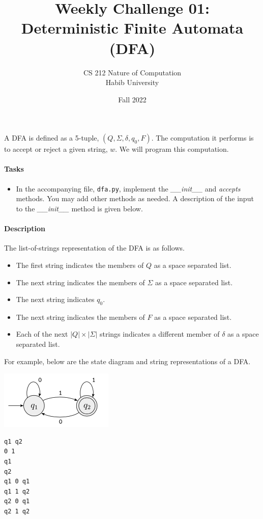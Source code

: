 \documentclass[a4paper]{exam}
\title{Weekly Challenge 01: Deterministic Finite Automata (DFA)}
\author{CS 212 Nature of Computation\\Habib University}
\date{Fall 2022}
\begin{document}
\maketitle

\begin{questions}
  

A DFA is defined as a 5-tuple, $(Q, \Sigma, \delta, q_0, F)$. The computation it performs is to accept or reject a given string, $w$. We will program this computation.

  \paragraph{Tasks}
  \begin{itemize}
  \item In the accompanying file, \texttt{dfa.py}, implement the \textit{\_\_init\_\_} and \textit{accepts} methods. You may add other methods as needed. A description of the input to the \textit{\_\_init\_\_} method is given below.
  \end{itemize}
 
  \paragraph{Description} The list-of-strings representation of the DFA is as follows.
  \begin{itemize}
  \item The first string indicates the members of $Q$ as a space separated list.
  \item The next string indicates the members of $\Sigma$ as a space separated list.
  \item The next string indicates $q_0$.
  \item The next string indicates the members of $F$ as a space separated list.
  \item Each of the next $|Q|\times|\Sigma|$ strings indicates a different member of $\delta$ as a space separated list.
  \end{itemize}
  For example, below are the state diagram and string representations of a DFA.
  
  \begin{minipage}{0.6\linewidth}
    \includegraphics{example}
  \end{minipage}
  \begin{minipage}{0.2\linewidth}
\begin{verbatim}
q1 q2
0 1
q1
q2
q1 0 q1
q1 1 q2
q2 0 q1
q2 1 q2
\end{verbatim}
  \end{minipage}
  

\end{questions}
\end{document}
